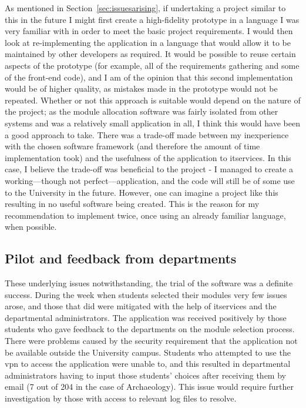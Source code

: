 As mentioned in Section~\ref{sec:issuesarising}, if undertaking a project
similar to this in the future I might first create a high-fidelity prototype
in a language I was very familiar with in order to meet the basic project
requirements. I would then look at re-implementing the application in a
language that would allow it to be maintained by other developers as required.
It would be possible to reuse certain aspects of the prototype (for example,
all of the requirements gathering and some of the front-end code), and I am of
the opinion that this second implementation would be of higher quality, as
mistakes made in the prototype would not be repeated. Whether or not this
approach is suitable would depend on the nature of the project; as the module
allocation software was fairly isolated from other systems and was a
relatively small application in all, I think this would have been a good
approach to take. There was a trade-off made between my inexperience with the
chosen software framework (and therefore the amount of time implementation
took) and the usefulness of the application to \gls{itservices}. In this case,
I believe the trade-off was beneficial to the project - I managed to create a
working---though not perfect---application, and the code will still be of some
use to the University in the future. However, one can imagine a project like
this resulting in no useful software being created. This is the reason for my
recommendation to implement twice, once using an already familiar language,
when possible.

\subsection{Pilot and feedback from departments}

These underlying issues notwithstanding, the trial of the software was a
definite success. During the week when students selected their modules very
few issues arose, and those that did were mitigated with the help of
\gls{itservices} and the departmental administrators. The application was
received positively by those students who gave feedback to the departments on
the module selection process. There were problems caused by the security
requirement that the application not be available outside the University
campus. Students who attempted to use the \gls{vpn} to access the application
were unable to, and this resulted in departmental administrators having to
input those students' choices after receiving them by email (7 out of 204 in
the case of Archaeology). This issue would require further investigation by
those with access to relevant log files to resolve.

